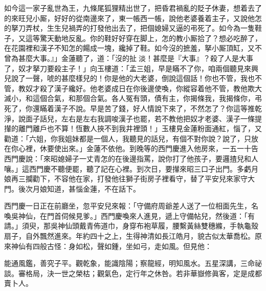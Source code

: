 如今這一家子亂世為王，九條尾狐狸精出世了，把昏君禍亂的貶子休妻，想着去了的來旺兒小厮，好好的從南邊來了，東一帳西一帳，說他老婆養着主子，又說他怎的拏刀弄杖，生生兒禍弄的打發他出去了，把個媳婦又逼的弔死了。如今為一隻鞋子，又這等驚天動地反亂。你的鞋好好穿在脚上，怎的教小厮拾了？想必吃醉了，在花園裡和漢子不知怎的餳成一塊，纔掉了鞋。如今沒的摭羞，拏小厮頂缸，{}又不曾為甚麼大事。』」金蓮聽了，道：「沒的扯𣭈淡！甚麼是『大事』？殺了人是大事了，奴才拏刀要殺主子！」向玉樓道：「孟三姐，早是瞞不了你，咱兩個聽見來興兒說了一聲，唬的甚麼樣兒的！你是他的大老婆，倒說這個話！你也不管，我也不管，教奴才殺了漢子纔好。他老婆成日在你後邊使喚，你縱容着他不管，教他欺大滅小，和這個合氣，和那個合氣。各人冤有頭，債有主，你揭條我，我揭條你，弔死了，你還瞞着漢子不說。早是苦了錢，好人情說下來了，不然怎了？{}你這等推乾淨，說面子話兒，左右是左右我調唆漢子也罷，若不教他把奴才老婆、漢子一條提攆的離門離戶也不算！恆數人挾不到我井裡頭！」玉樓見金蓮粉面通紅，惱了，又勸道：「六姐，你我姐妹都是一個人，我聽見的話兒，有個不對你說？說了，只放在你心裡，休要使出來。」{}金蓮不依他。到晚等的西門慶進入他房來，一五一十告西門慶說：「來昭媳婦子一丈青怎的在後邊指罵，說你打了他孩子，要邏揸兒和人嚷。」這西門慶不聽便罷，聽了記在心裡。到次日，要攆來昭三口子出門。多虧月娘再三攔勸下，不容他在家，打發他往獅子街房子裡看守，替了平安兒來家守大門。後次月娘知道，甚惱金蓮，不在話下。

西門慶一日正在前廳坐，忽平安兒來報：「守備府周爺差人送了一位相面先生，名喚吳神仙，在門首伺候見爹。」西門慶喚來人進見，遞上守備帖兒，然後道：「有請。」須臾，那吳神仙頭戴青佈道巾，身穿布袍草履，腰繫黃絲雙穗縧，手執龜殼扇子，自外飄然進來。年約四十之上，生得神清如長江皓月，貌古似太華喬松。原來神仙有四般古怪：身如松，聲如鍾，坐如弓，走如風。但見他：

\begin{myquote}
能通風鑑，善究子平。觀乾象，能識陰陽；察龍經，明知風水。五星深講，三命祕談。審格局，決一世之榮枯；觀氣色，定行年之休咎。若非華嶽修眞客，定是成都賣卜人。
\end{myquote}

